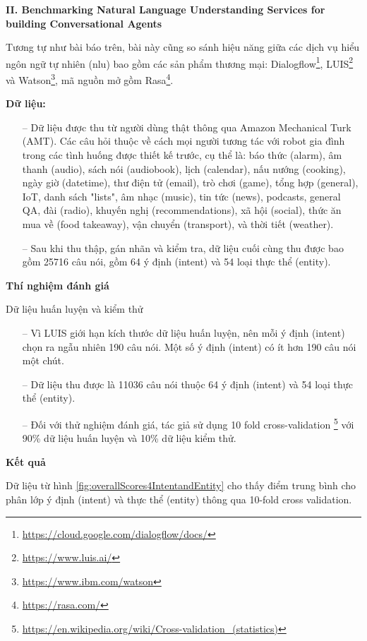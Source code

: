 \textbf{II. Benchmarking Natural Language Understanding Services for building Conversational Agents}

Tương tự như bài báo trên, bài này cũng so sánh hiệu năng giữa các dịch vụ hiểu ngôn ngữ tự nhiên (\ac{nlu}) bao gồm các sản phẩm thương mại: Dialogflow\footnote{\url{https://cloud.google.com/dialogflow/docs/}}, LUIS\footnote{\url{https://www.luis.ai/}} và Watson\footnote{\url{https://www.ibm.com/watson}}, mã nguồn mở gồm Rasa\footnote{\url{https://rasa.com/}}.


\textbf{Dữ liệu: }

\begin{itemize}
    \item[--] Dữ liệu được thu từ người dùng thật thông qua Amazon Mechanical Turk (AMT). Các câu hỏi thuộc về cách mọi người tương tác với robot gia đình trong các tình huống được thiết kế trước, cụ thể là: báo thức (alarm), âm thanh (audio), sách nói (audiobook), lịch (calendar), nấu nướng (cooking), ngày giờ (datetime), thư điện tử (email), trò chơi (game), tổng hợp (general), IoT, danh sách "lists", âm nhạc (music), tin tức (news), podcasts, general QA, đài (radio), khuyến nghị (recommendations), xã hội (social), thức ăn mua về (food takeaway), vận chuyển (transport), và thời tiết (weather).
    \item[--] Sau khi thu thập, gán nhãn và kiểm tra, dữ liệu cuối cùng thu được bao gồm 25716 câu nói, gồm 64 ý định (intent) và 54 loại thực thể (entity).
\end{itemize}

\textbf{Thí nghiệm đánh giá}

Dữ liệu huấn luyện và kiểm thử
\begin{itemize}
    \item[--] Vì LUIS giới hạn kích thước dữ liệu huấn luyện, nên mỗi ý định (intent) chọn ra ngẫu nhiên 190 câu nói. Một số ý định (intent) có ít hơn 190 câu nói một chút.
    \item[--] Dữ liệu thu được là 11036 câu nói thuộc 64 ý định (intent) và 54 loại thực thể (entity).
    \item[--] Đối với thử nghiệm đánh giá, tác giả sử dụng 10 fold cross-validation \footnote{\url{https://en.wikipedia.org/wiki/Cross-validation_(statistics)}} với 90\% dữ liệu huấn luyện và 10\% dữ liệu kiểm thử.
\end{itemize}

\textbf{Kết quả}

Dữ liệu từ hình \ref{fig:overallScores4IntentandEntity} cho thấy điểm trung bình cho phân lớp ý định (intent) và thực thể (entity) thông qua 10-fold cross validation.


